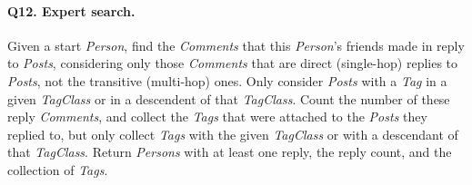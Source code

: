 \paragraph{\textbf{Q12}. Expert search.}
Given a start \emph{Person}, find the \emph{Comments} that this
\emph{Person}'s friends made in reply to \emph{Posts}, considering only
those \emph{Comments} that are direct (single-hop) replies to
\emph{Posts}, not the transitive (multi-hop) ones. Only consider
\emph{Posts} with a \emph{Tag} in a given \emph{TagClass} or in a
descendent of that \emph{TagClass}. Count the number of these reply
\emph{Comments}, and collect the \emph{Tags} that were attached to the
\emph{Posts} they replied to, but only collect \emph{Tags} with the
given \emph{TagClass} or with a descendant of that \emph{TagClass}.
Return \emph{Persons} with at least one reply, the reply count, and the
collection of \emph{Tags}.
